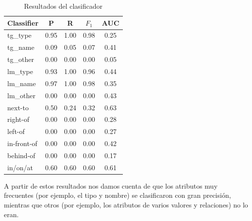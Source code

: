 \begin{table}[ht]
\begin{center}
\footnotesize{
\caption{Resultados del clasificador}
\begin{tabular}{l c c c c }
\hline
{{Classifier}}	& {P} & {R} & {$F_{1}$} & {AUC} \\
\hline
{{tg\_type}} 			& 0.95 & 1.00 & 0.98 & 0.25 \\
{{tg\_name}}			& 0.09 & 0.05 & 0.07 & 0.41 \\
{{tg\_other}}			& 0.00 & 0.00 & 0.00 & 0.05 \\                               
{{lm\_type}}			& 0.93 & 1.00 & 0.96 & 0.44 \\                               
{{lm\_name}}			& 0.97 & 1.00 & 0.98 & 0.35 \\                               
{{lm\_other}}			& 0.00 & 0.00 & 0.00 & 0.43 \\                               
{{next-to}}				& 0.50 & 0.24 & 0.32 & 0.63 \\                               
{{right-of}}			& 0.00 & 0.00 & 0.00 & 0.28 \\                               
{{left-of}}				& 0.00 & 0.00 & 0.00 & 0.27 \\                               
{{in-front-of}}		& 0.00 & 0.00 & 0.00 & 0.42 \\                               
{{behind-of}}			& 0.00 & 0.00 & 0.00 & 0.17 \\                               
{{in/on/at}} 			& 0.60 & 0.60 & 0.60 & 0.61 \\                               
\hline                   
\end{tabular}
\label{tab-svm-results}
}
\end{center}
\end{table}
\normalsize


A partir de estos resultados nos damos cuenta de que los atributos muy frecuentes (por ejemplo, el tipo y nombre) se clasificaron con gran precisi\'on, mientras que otros (por ejemplo, los atributos de varios valores y relaciones) no lo eran.

